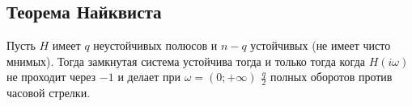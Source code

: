 \subsection{Теорема Найквиста}
Пусть $H$ имеет $q$ неустойчивых полюсов и $n-q$ устойчивых (не имеет чисто мнимых). Тогда замкнутая система устойчива тогда и только тогда когда $H(i \omega)$ не проходит через $-1$ и делает при $\omega = (0; +\infty)$ $\frac{q}{2}$ полных оборотов против часовой стрелки. 
\begin{figure}[H]
\end{figure}
